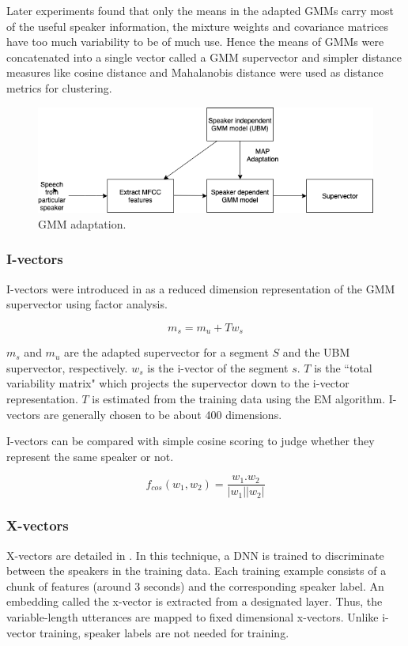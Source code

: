 		Later experiments found that only the means in the adapted GMMs carry most of the useful speaker information, the mixture weights and covariance matrices have too much variability to be of much use. Hence the means of GMMs were concatenated into a single vector called a GMM supervector and simpler distance measures like cosine distance and Mahalanobis distance were used as distance metrics for clustering.
		
		\begin{figure}[h]
			\includegraphics[width=15cm]{figures/supervector.png}
			\centering
			\caption{GMM adaptation.}
			\label{fig:fig-supervector}
		\end{figure}

		\subsubsection{I-vectors}
		I-vectors were introduced in \cite{5545402} as a reduced dimension representation of the GMM supervector using factor analysis.
		
		$$ m_s = m_u + Tw_s $$
		
		$m_s$ and $m_u$ are the adapted supervector for a segment $S$ and the UBM supervector, respectively. $w_s$ is the i-vector of the segment $s$. $T$ is the ``total variability matrix" which projects the supervector down to the i-vector representation. $T$ is estimated from the training data using the EM algorithm. I-vectors are generally chosen to be about 400 dimensions.
		
		I-vectors can be compared with simple cosine scoring to judge whether they represent the same speaker or not.
		
		$$ f_{cos}(w_1, w_2) = \frac{w_1.w_2}{|w_1||w_2|} $$
		
		\subsubsection{X-vectors}
		X-vectors are detailed in \cite{snyder2018x}. In this technique, a DNN is trained to discriminate between the speakers in the training data. Each training example consists of a chunk of features (around 3 seconds) and the corresponding speaker label. An embedding called the x-vector is extracted from a designated layer. Thus, the variable-length utterances are mapped to fixed dimensional x-vectors. Unlike i-vector training, speaker labels are not needed for training.
		
